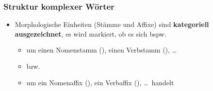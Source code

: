 \begin{frame}
\frametitle{Struktur komplexer Wörter}

\begin{minipage}{0.65\textwidth}
\begin{itemize}
	\item Morphologische Einheiten (Stämme und Affixe) sind \textbf{kategoriell ausgezeichnet}, \dash es wird markiert, ob es sich bspw. 
	
	\begin{itemize}
		\item um einen Nomenstamm (), einen Verbstamm (), \ldots 
		\item[] bzw.
		\item um ein Nomenaffix (), ein Verbaffix (), \ldots\  handelt
	\end{itemize}
\end{itemize}
\end{minipage}
%
\hfill%
%
\begin{minipage}{.34\textwidth}

\begin{figure}	
\centering
{}

\vspace{.5cm}

\centering
{}
\end{figure}
\end{minipage}
\end{frame}


